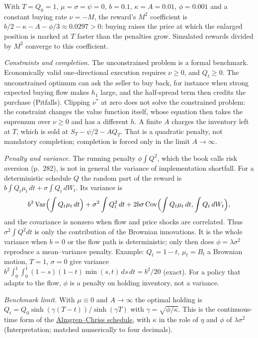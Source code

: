 \begin{qfmodel}
With $T=Q_0=1$, $\mu=\sigma=\psi=0$, $b=0.1$, $\kappa=A=0.01$, $\phi=0.001$ and a constant buying rate $\nu=-M$, the reward's $M^2$ coefficient is $b/2-\kappa-A-\phi/3\approx0.0297>0$: buying raises the price at which the enlarged position is marked at $T$ faster than the penalties grow. Simulated rewards divided by $M^2$ converge to this coefficient.

\emph{Constraints and completion.} The unconstrained problem is a formal benchmark. Economically valid one-directional execution requires $\nu\ge0$, and $Q_t\ge0$. The unconstrained optimum can ask the seller to buy back, for instance when strong expected buying flow makes $h_1$ large, and the half-spread term then credits the purchase (Pitfalls). Clipping $\nu^*$ at zero does not solve the constrained problem: the constraint changes the value function itself, whose equation then takes the supremum over $\nu\ge0$ and has a different $h$. A finite $A$ charges the inventory left at $T$, which is sold at $S_T-\psi/2-AQ_T$. That is a quadratic penalty, not mandatory completion; completion is forced only in the limit $A\to\infty$.

\emph{Penalty and variance.} The running penalty $\phi\int Q^2$, which the book calls risk aversion (p.~282), is not in general the variance of implementation shortfall. For a deterministic schedule $Q$ the random part of the reward is $b\int Q_t\mu_t\,dt+\sigma\int Q_t\,dW_t$. Its variance is
\[ b^2\operatorname{Var}\Bigl(\int Q_t\mu_t\,dt\Bigr)+\sigma^2\int Q_t^2\,dt+2b\sigma\operatorname{Cov}\Bigl(\int Q_t\mu_t\,dt,\int Q_t\,dW_t\Bigr), \]
and the covariance is nonzero when flow and price shocks are correlated. Thus $\sigma^2\int Q^2dt$ is only the contribution of the Brownian innovations. It is the whole variance when $b=0$ or the flow path is deterministic; only then does $\phi=\lambda\sigma^2$ reproduce a mean--variance penalty. Example: $Q_t=1-t$, $\mu_t=B_t$ a Brownian motion, $T=1$, $\sigma=0$ give variance $b^2\int_0^1\!\int_0^1(1-s)(1-t)\min(s,t)\,ds\,dt=b^2/20$ (exact). For a policy that adapts to the flow, $\phi$ is a penalty on holding inventory, not a variance.

\emph{Benchmark limit.} With $\mu\equiv0$ and $A\to\infty$ the optimal holding is $Q_t=Q_0\sinh(\gamma(T-t))/\sinh(\gamma T)$ with $\gamma=\sqrt{\phi/\kappa}$. This is the continuous-time form of the \hyperref[mod:almgren-chriss-execution]{Almgren--Chriss schedule}, with $\kappa$ in the role of $\eta$ and $\phi$ of $\lambda\sigma^2$ (Interpretation; matched numerically to four decimals).


\end{qfmodel}
